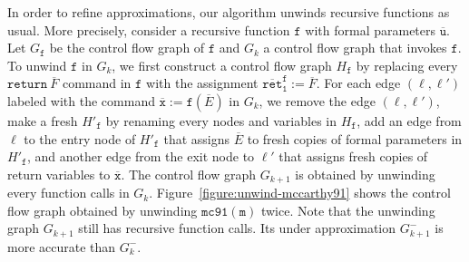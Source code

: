 In order to refine approximations, our algorithm unwinds recursive
functions as usual. More precisely, consider a recursive function
$\mathtt{f}$ with formal parameters $\overline{\mathtt{u}}$. Let
$G_{\mathtt{f}}$ be  
the control flow graph of $\mathtt{f}$ and $G_k$ a control flow graph
that invokes $\mathtt{f}$. To unwind $\mathtt{f}$ in $G_k$, 
we first construct a control flow graph $H_{\mathtt{f}}$ by 
replacing every $\mathtt{return}\ \overline{F}$ command in
$\mathtt{f}$ with the assignment $\mathtt{\overline{ret}^f_1} :=
\overline{F}$. For each edge $(\ell,  
\ell')$ labeled with the command $\overline{\mathtt{x}} :=
\mathtt{f}(\overline{E})$ in $G_k$, we remove 
the edge $(\ell, \ell')$, make a fresh $H'_{\mathtt{f}}$ by
renaming every nodes and variables in $H_{\mathtt{f}}$, add an edge
from $\ell$ to the entry node of $H'_{\mathtt{f}}$ that assigns
$\overline{E}$ to fresh copies of formal parameters in 
$H'_{\mathtt{f}}$, and another edge from the exit node to $\ell'$ that
assigns fresh copies of return variables to
$\overline{\mathtt{x}}$. The control flow graph $G_{k+1}$ 
is obtained by unwinding every function calls in $G_k$. 
Figure~\ref{figure:unwind-mccarthy91} shows the control flow graph
obtained by unwinding $\mathtt{mc91(m)}$ twice. Note that the
unwinding graph $G_{k+1}$ still has recursive function calls. Its
under approximation $G^-_{k+1}$ is more accurate than $G^-_k$.

